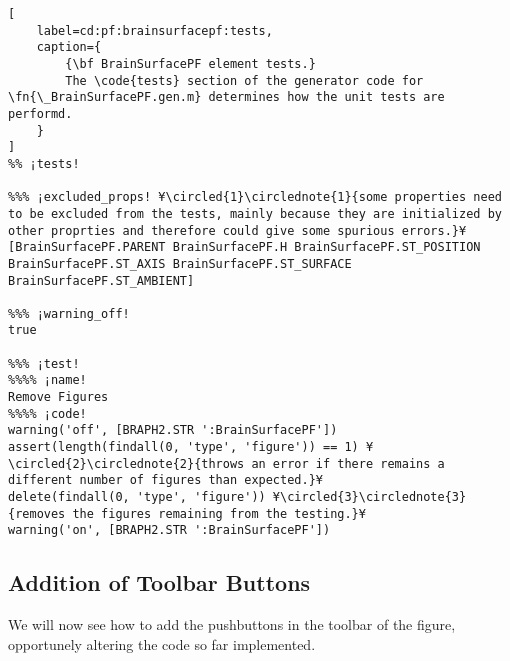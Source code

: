 \documentclass{tufte-handout}
\begin{document}
\begin{lstlisting}[
	label=cd:pf:brainsurfacepf:tests,
	caption={
		{\bf BrainSurfacePF element tests.}
		The \code{tests} section of the generator code for \fn{\_BrainSurfacePF.gen.m} determines how the unit tests are performd.
	}
]
%% ¡tests!

%%% ¡excluded_props! ¥\circled{1}\circlednote{1}{some properties need to be excluded from the tests, mainly because they are initialized by other proprties and therefore could give some spurious errors.}¥
[BrainSurfacePF.PARENT BrainSurfacePF.H BrainSurfacePF.ST_POSITION BrainSurfacePF.ST_AXIS BrainSurfacePF.ST_SURFACE BrainSurfacePF.ST_AMBIENT]

%%% ¡warning_off!
true

%%% ¡test!
%%%% ¡name!
Remove Figures
%%%% ¡code!
warning('off', [BRAPH2.STR ':BrainSurfacePF'])
assert(length(findall(0, 'type', 'figure')) == 1) ¥\circled{2}\circlednote{2}{throws an error if there remains a different number of figures than expected.}¥
delete(findall(0, 'type', 'figure')) ¥\circled{3}\circlednote{3}{removes the figures remaining from the testing.}¥
warning('on', [BRAPH2.STR ':BrainSurfacePF'])
\end{lstlisting}

\subsection{Addition of Toolbar Buttons}

We will now see how to add the pushbuttons in the toolbar of the figure, opportunely altering the code so far implemented.
\end{document}
